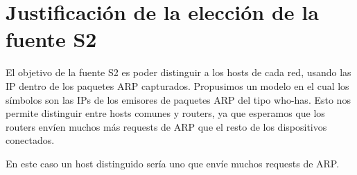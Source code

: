 \section{Justificación de la elección de la fuente S2}

El objetivo de la fuente S2 es poder distinguir a los hosts de cada red, usando las IP dentro de los paquetes ARP capturados. Propusimos un modelo en el cual los símbolos son las IPs de los emisores de paquetes ARP del tipo who-has. Esto nos permite distinguir entre hosts comunes y routers, ya que esperamos que los routers envíen muchos más requests de ARP que el resto de los dispositivos conectados.

En este caso un host distinguido sería uno que envíe muchos requests de ARP.


